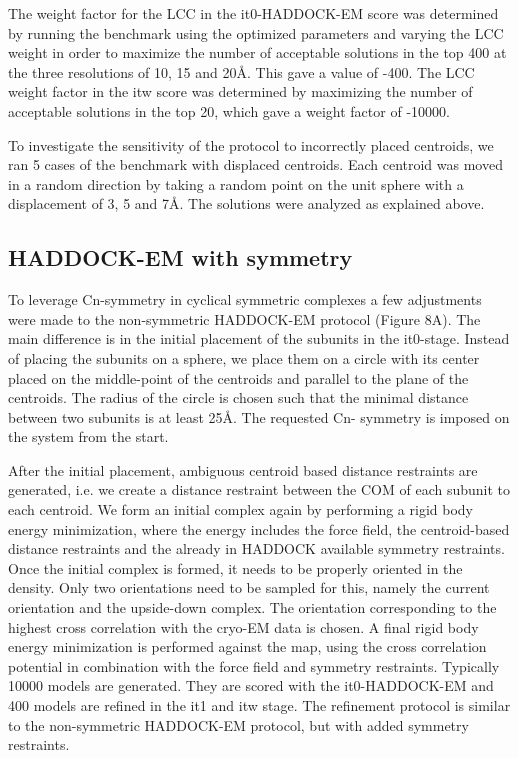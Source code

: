 The weight factor for the LCC in the it0-HADDOCK-EM score was determined by running the benchmark using the optimized parameters and varying the LCC weight in order to maximize the number of acceptable solutions in the top 400 at the three resolutions of 10, 15 and 20Å. This gave a value of -400. 
The LCC weight factor in the itw score was determined by maximizing the number of acceptable solutions in the top 20, which gave a weight factor of -10000.

To investigate the sensitivity of the protocol to incorrectly placed centroids, we ran 5 cases of the benchmark with displaced centroids. 
Each centroid was moved in a random direction by taking a random point on the unit sphere with a displacement of 3, 5 and 7Å. 
The solutions were analyzed as explained above.

\subsection{HADDOCK-EM with symmetry}

To leverage Cn-symmetry in cyclical symmetric complexes a few adjustments were made to the non-symmetric HADDOCK-EM protocol (Figure 8A). 
The main difference is in the initial placement of the subunits in the it0-stage. 
Instead of placing the subunits on a sphere, we place them on a circle with its center placed on the middle-point of the centroids and parallel to the plane of the centroids. 
The radius of the circle is chosen such that the minimal distance between two subunits is at least 25Å. 
The requested Cn- symmetry is imposed on the system from the start. 

After the initial placement, ambiguous centroid based distance restraints are generated, i.e. we create a distance restraint between the COM of each subunit to each centroid. 
We form an initial complex again by performing a rigid body energy minimization, where the energy includes the force field, the centroid-based distance restraints and the already in HADDOCK available symmetry restraints. 
Once the initial complex is formed, it needs to be properly oriented in the density. 
Only two orientations need to be sampled for this, namely the current orientation and the upside-down complex. 
The orientation corresponding to the highest cross correlation with the cryo-EM data is chosen. 
A final rigid body energy minimization is performed against the map, using the cross correlation potential in combination with the force field and symmetry restraints. 
Typically 10000 models are generated. 
They are scored with the it0-HADDOCK-EM and 400 models are refined in the it1 and itw stage. 
The refinement protocol is similar to the non-symmetric HADDOCK-EM protocol, but with added symmetry restraints.

